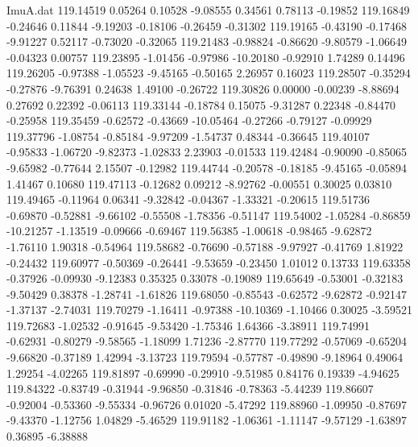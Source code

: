 \begin{filecontents}{ImuA.dat}
 119.14519    0.05264    0.10528   -9.08555    0.34561    0.78113   -0.19852
 119.16849   -0.24646    0.11844   -9.19203   -0.18106   -0.26459   -0.31302
 119.19165   -0.43190   -0.17468   -9.91227    0.52117   -0.73020   -0.32065
 119.21483   -0.98824   -0.86620   -9.80579   -1.06649   -0.04323    0.00757
 119.23895   -1.01456   -0.97986  -10.20180   -0.92910    1.74289    0.14496
 119.26205   -0.97388   -1.05523   -9.45165   -0.50165    2.26957    0.16023
 119.28507   -0.35294   -0.27876   -9.76391    0.24638    1.49100   -0.26722
 119.30826    0.00000   -0.00239   -8.88694    0.27692    0.22392   -0.06113
 119.33144   -0.18784    0.15075   -9.31287    0.22348   -0.84470   -0.25958
 119.35459   -0.62572   -0.43669  -10.05464   -0.27266   -0.79127   -0.09929
 119.37796   -1.08754   -0.85184   -9.97209   -1.54737    0.48344   -0.36645
 119.40107   -0.95833   -1.06720   -9.82373   -1.02833    2.23903   -0.01533
 119.42484   -0.90090   -0.85065   -9.65982   -0.77644    2.15507   -0.12982
 119.44744   -0.20578   -0.18185   -9.45165   -0.05894    1.41467    0.10680
 119.47113   -0.12682    0.09212   -8.92762   -0.00551    0.30025    0.03810
 119.49465   -0.11964    0.06341   -9.32842   -0.04367   -1.33321   -0.20615
 119.51736   -0.69870   -0.52881   -9.66102   -0.55508   -1.78356   -0.51147
 119.54002   -1.05284   -0.86859  -10.21257   -1.13519   -0.09666   -0.69467
 119.56385   -1.00618   -0.98465   -9.62872   -1.76110    1.90318   -0.54964
 119.58682   -0.76690   -0.57188   -9.97927   -0.41769    1.81922   -0.24432
 119.60977   -0.50369   -0.26441   -9.53659   -0.23450    1.01012    0.13733
 119.63358   -0.37926   -0.09930   -9.12383    0.35325    0.33078   -0.19089
 119.65649   -0.53001   -0.32183   -9.50429    0.38378   -1.28741   -1.61826
 119.68050   -0.85543   -0.62572   -9.62872   -0.92147   -1.37137   -2.74031
 119.70279   -1.16411   -0.97388  -10.10369   -1.10466    0.30025   -3.59521
 119.72683   -1.02532   -0.91645   -9.53420   -1.75346    1.64366   -3.38911
 119.74991   -0.62931   -0.80279   -9.58565   -1.18099    1.71236   -2.87770
 119.77292   -0.57069   -0.65204   -9.66820   -0.37189    1.42994   -3.13723
 119.79594   -0.57787   -0.49890   -9.18964    0.49064    1.29254   -4.02265
 119.81897   -0.69990   -0.29910   -9.51985    0.84176    0.19339   -4.94625
 119.84322   -0.83749   -0.31944   -9.96850   -0.31846   -0.78363   -5.44239
 119.86607   -0.92004   -0.53360   -9.55334   -0.96726    0.01020   -5.47292
 119.88960   -1.09950   -0.87697   -9.43370   -1.12756    1.04829   -5.46529
 119.91182   -1.06361   -1.11147   -9.57129   -1.63897    0.36895   -6.38888

\end{filecontents}
